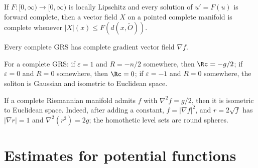 \begin{lemma}
\label{lem:chow-iv-vector-field-completeness}
If $F:[0,\infty)\to[0,\infty)$ is locally Lipschitz and every solution of
$u'=F(u)$ is forward complete, then a vector field $X$ on a pointed complete
manifold is complete whenever $|X|(x)\le F(d(x,\widetilde O))$.
\end{lemma}

\begin{corollary}
\label{cor:chow-iv-gradient-complete}
Every complete GRS has complete gradient vector field $\nabla f$.
\end{corollary}

\begin{proposition}
\label{prop:chow-iv-scalar-lower-equality}
For a complete GRS: if $\varepsilon=1$ and $R=-n/2$ somewhere, then
$\Rc=-g/2$; if $\varepsilon=0$ and $R=0$ somewhere, then $\Rc=0$; if
$\varepsilon=-1$ and $R=0$ somewhere, the soliton is Gaussian and isometric to
Euclidean space.
\end{proposition}

\begin{lemma}
\label{lem:chow-iv-hessian-characterizes-euclidean}
If a complete Riemannian manifold admits $f$ with $\nabla^2f=g/2$, then it is
isometric to Euclidean space.  Indeed, after adding a constant,
$f=|\nabla f|^2$, and $r=2\sqrt f$ has $|\nabla r|=1$ and
$\nabla^2(r^2)=2g$; the homothetic level sets are round spheres.
\end{lemma}

\section{Estimates for potential functions}

